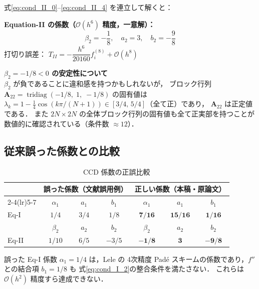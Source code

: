 \documentclass[12pt, a4paper, titlepage]{article}
\newcommand{\jp}[1]{{\normalfont\jpfont #1}}
\newcommand{\Ord}[1]{\mathcal{O}(#1)}
\begin{document}
\jp{式\eqref{eq:cond_II_0}--\eqref{eq:cond_II_4} を連立して解くと：}

\begin{tcolorbox}[resultbox]
\textbf{\jp{Equation-II の係数（}$\Ord{h^6}$ \jp{精度，一意解）：}}
\begin{equation}
  \boxed{
    \beta_2 = -\frac{1}{8},\quad
    a_2 = 3,\quad
    b_2 = -\frac{9}{8}
  }
  \label{eq:coef_II}
\end{equation}
\jp{打切り誤差：} $T_{II} = -\dfrac{h^6}{20160}f^{(8)}_i + \Ord{h^8}$
\end{tcolorbox}

\begin{tcolorbox}[warnbox]
\textbf{$\beta_2 = -1/8 < 0$ \jp{の安定性について}}\\
\jp{$\beta_2$ が負であることに違和感を持つかもしれないが，
ブロック行列 $\bm{A}_{22} = \operatorname{tridiag}(-1/8,\;1,\;-1/8)$ の固有値は
$\lambda_k = 1 - \frac{1}{4}\cos(k\pi/(N+1)) \in [3/4,\, 5/4]$（全て正）であり，
$\bm{A}_{22}$ は正定値である．
また $2N\times2N$ の全体ブロック行列の固有値も全て正実部を持つことが
数値的に確認されている（条件数 $\approx 12$）．}
\end{tcolorbox}

\subsection{\jp{従来誤った係数との比較}}

\begin{table}[h]
\centering
\caption{\jp{CCD 係数の正誤比較}}
\label{tab:coef_compare}
\begin{tabular}{lcccccc}
\toprule
 & \multicolumn{3}{c}{\jp{誤った係数（文献誤用例）}} & \multicolumn{3}{c}{\jp{正しい係数（本稿・原論文）}}\\
\cmidrule(lr){2-4}\cmidrule(lr){5-7}
 & $\alpha_1$ & $a_1$ & $b_1$ & $\alpha_1$ & $a_1$ & $b_1$\\
\midrule
Eq-I & $1/4$ & $3/4$ & $1/8$ & $\mathbf{7/16}$ & $\mathbf{15/16}$ & $\mathbf{1/16}$\\
\midrule
 & $\beta_2$ & $a_2$ & $b_2$ & $\beta_2$ & $a_2$ & $b_2$\\
\midrule
Eq-II & $1/10$ & $6/5$ & $-3/5$ & $\mathbf{-1/8}$ & $\mathbf{3}$ & $\mathbf{-9/8}$\\
\bottomrule
\end{tabular}
\end{table}

\jp{誤った Eq-I 係数 $\alpha_1=1/4$ は，Lele \cite{Lele1992} の
4次精度 Padé スキームの係数であり，$f''$ との結合項 $b_1=1/8$ も
式\eqref{eq:cond_I_2}の整合条件を満たさない．
これらは $\Ord{h^2}$ 精度すら達成できない．}
\end{document}

